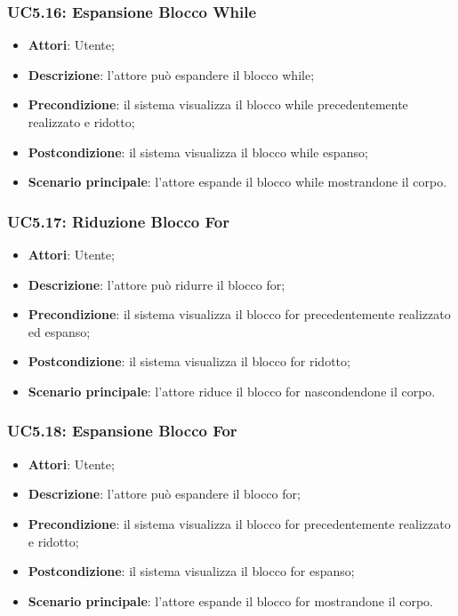 \subsubsection{UC5.16: Espansione Blocco While	}
\label{UC5.16}
\begin{itemize}
\item \textbf{Attori}: Utente;
\item \textbf{Descrizione}: l'attore può espandere il blocco while;	
\item \textbf{Precondizione}: il sistema visualizza il blocco while precedentemente realizzato e ridotto;	
\item \textbf{Postcondizione}: il sistema visualizza il blocco while espanso;	
\item \textbf{Scenario principale}:
l'attore espande il blocco while mostrandone il corpo.	
\end{itemize}

\subsubsection{UC5.17: Riduzione Blocco For	}
\label{UC5.17}
\begin{itemize}
\item \textbf{Attori}: Utente;
\item \textbf{Descrizione}: l'attore può ridurre il blocco for;	
\item \textbf{Precondizione}: il sistema visualizza il blocco for precedentemente realizzato ed espanso;	
\item \textbf{Postcondizione}: il sistema visualizza il blocco for ridotto;	
\item \textbf{Scenario principale}:
l'attore riduce il blocco for nascondendone il corpo.	
\end{itemize}

\subsubsection{UC5.18: Espansione Blocco For}
\label{UC5.18}
\begin{itemize}
\item \textbf{Attori}: Utente;
\item \textbf{Descrizione}: l'attore può espandere il blocco for;	
\item \textbf{Precondizione}: il sistema visualizza il blocco for precedentemente realizzato e ridotto;	
\item \textbf{Postcondizione}: il sistema visualizza il blocco for espanso;	
\item \textbf{Scenario principale}:
l'attore espande il blocco for mostrandone il corpo.	
\end{itemize}

